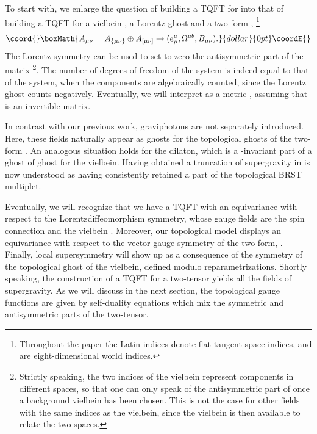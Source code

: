 \documentclass[a4paper,12pt]{article}
\begin{document}
To start with, we enlarge the question of building a TQFT for 
\coordHE{} into that of building a TQFT for a vielbein \coordHE{},  a Lorentz
ghost \coordHE{} and  a two-form   \coordHE{},%
\footnote{Throughout the paper the Latin indices
\coordHE{} denote flat \coordHE{} tangent space indices, and
\myHighlight{$\mu,\nu,\ldots$}\coordHE{} are eight-dimensional world indices.}
$$\coord{}\boxMath{A_{\mu\nu}= A_{\{\mu\nu\}} \oplus  A_{[\mu\nu]} \to (e^a_\mu,
\Omega^{ab},B_{\mu\nu}). }{dollar}{0pt}\coordE{}$$
The Lorentz symmetry can be used to set to zero the
antisymmetric part of the matrix \coordHE{}\footnote{Strictly speaking,
the two indices of the vielbein represent components in different spaces,
so that one can only speak of the antisymmetric part of \coordHE{} once a
background vielbein has been chosen. This is not the case for other fields
with the same indices as the vielbein, since the vielbein is then available
to relate the two spaces.}.
The number of degrees of freedom of the system 
\coordHE{}  is indeed
equal to that of the \coordHE{}
system, when the components are
algebraically counted, since the Lorentz ghost \coordHE{} counts
negatively. Eventually, we will interpret 
\coordHE{} as a metric \coordHE{},
assuming that \coordHE{} is an invertible matrix.

In contrast with our previous work, graviphotons   are not separately
introduced. Here, these fields   naturally appear  as ghosts for the
topological ghosts of the two-form \coordHE{}. An analogous situation
holds for the dilaton, which is a \coordHE{}-invariant part of a ghost
of ghost for the vielbein. Having obtained a truncation of supergravity
in \cite{BT2} is now understood  as having  consistently retained a
part of the topological BRST multiplet.

Eventually, we will recognize that we have a TQFT with an equivariance
with respect  to the Lorentz\myHighlight{$\times$}\coordHE{}diffeomorphism symmetry, whose
gauge fields are the spin connection \coordHE{} and the vielbein
\coordHE{}.  Moreover, our topological model displays an equivariance
with respect to the vector gauge symmetry of the two-form, \coordHE{}.  Finally, local supersymmetry will show up  as a
consequence of the symmetry of the topological ghost of the  vielbein,
defined modulo reparametrizations.  Shortly speaking, the construction
of a TQFT for a two-tensor yields all the  fields of supergravity. As
we will discuss in the next section, the topological gauge functions
are given by self-duality equations which mix the symmetric and
antisymmetric parts of the two-tensor.
\end{document}
